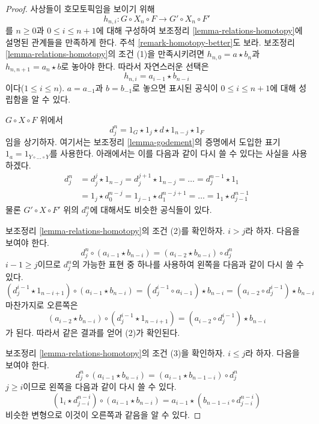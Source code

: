 \begin{proof}
사상들이 호모토픽임을 보이기 위해
$$
h_{n, i} : G \circ X_n \circ F \to G' \circ X_n \circ F'
$$
를 $n \geq 0$과 $0 \leq i \leq n + 1$에 대해 구성하여 보조정리
\ref{lemma-relations-homotopy}에 설명된 관계들을 만족하게 한다.
주석 \ref{remark-homotopy-better}도 보라. 보조정리
\ref{lemma-relations-homotopy}의 조건 (1)을 만족시키려면
$h_{n, 0} = a \star b_n$과 $h_{n , n + 1} = a_n \star b$로 놓아야
한다. 따라서 자연스러운 선택은
$$
h_{n , i} = a_{i - 1} \star b_{n - i}
$$
이다($1 \leq i \leq n$). $a = a_{-1}$과 $b = b_{-1}$로 놓으면
표시된 공식이 $0 \leq i \leq n + 1$에 대해 성립함을 알 수 있다.

\medskip\noindent
$G \circ X \circ F$ 위에서
$$
d^n_j = 1_G \star 1_j \star d \star 1_{n - j} \star 1_F
$$
임을 상기하자. 여기서는 보조정리 \ref{lemma-godement}의 증명에서
도입한 표기 $1_a = 1_{Y \circ \ldots \circ Y}$를 사용한다. 아래에서는
이를 다음과 같이 다시 쓸 수 있다는 사실을 사용하겠다.
\begin{align*}
d^n_j
& =
d^j_j \star 1_{n - j} =
d^{j + 1}_j \star 1_{n - j} = \ldots = d^{n - 1}_j \star 1_1 \\
& =
1_j \star d^{n - j}_0 = 1_{j - 1} \star d^{n - j + 1}_1 = \ldots =
1_1 \star d^{n - 1}_{j - 1}
\end{align*}
물론 $G' \circ X \circ F'$ 위의 $d^n_j$에 대해서도 비슷한 공식들이
있다.

\medskip\noindent
보조정리 \ref{lemma-relations-homotopy}의 조건 (2)를 확인하자.
$i > j$라 하자. 다음을 보여야 한다.
$$
d^n_j \circ (a_{i - 1} \star b_{n - i}) =
(a_{i - 2} \star b_{n - i}) \circ d^n_j
$$
$i - 1 \geq j$이므로 $d^n_j$의 가능한 표현 중 하나를 사용하여
왼쪽을 다음과 같이 다시 쓸 수 있다.
$$
(d^{i - 1}_j \star 1_{n - i + 1}) \circ (a_{i - 1} \star b_{n - i}) =
(d^{i - 1}_j \circ a_{i - 1}) \star b_{n - i} =
(a_{i - 2} \circ d^{i - 1}_j) \star b_{n - i}
$$
마찬가지로 오른쪽은
$$
(a_{i - 2} \star b_{n - i}) \circ (d^{i - 1}_j \star 1_{n - i + 1}) =
(a_{i - 2} \circ d^{i - 1}_j) \star b_{n - i}
$$
가 된다. 따라서 같은 결과를 얻어 (2)가 확인된다.

\medskip\noindent
보조정리 \ref{lemma-relations-homotopy}의 조건 (3)을 확인하자.
$i \leq j$라 하자. 다음을 보여야 한다.
$$
d^n_j \circ (a_{i - 1} \star b_{n - i}) =
(a_{i - 1} \star b_{n - 1 - i}) \circ d^n_j
$$
$j \geq i$이므로 왼쪽을 다음과 같이 다시 쓸 수 있다.
$$
(1_i \star d^{n - i}_{j - i}) \circ (a_{i - 1} \star b_{n - i}) =
a_{i - 1} \star (b_{n - 1 - i} \circ d^{n - i}_{j - i})
$$
비슷한 변형으로 이것이 오른쪽과 같음을 알 수 있다.


\end{proof}
